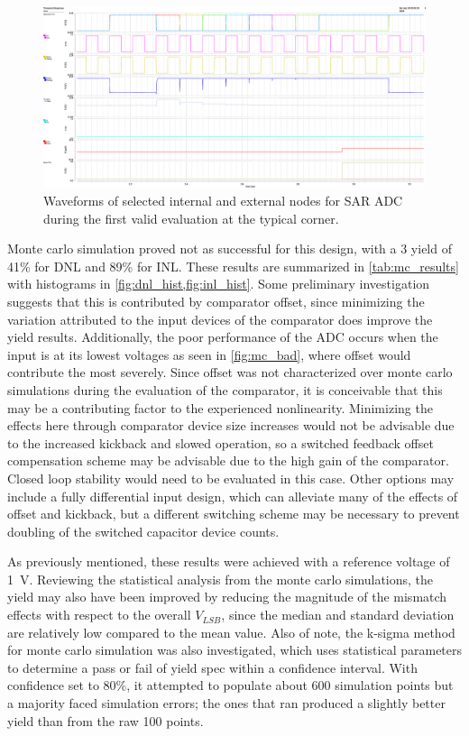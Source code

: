 \documentclass[11pt,letterpaper]{article}
\begin{document}
\begin{figure}[htbp!]
		\centering
	    \includegraphics[width=\textwidth]{images/waveform_typ.eps}
		\caption{Waveforms of selected internal and external nodes for SAR ADC during the first valid evaluation at the typical corner.}\label{fig:typ_wave}
\end{figure}

Monte carlo simulation proved not as successful for this design, with a \qty{3}{\sig} yield of 41\% for DNL and 89\% for INL\@. These results are summarized in \cref{tab:mc_results} with histograms in \cref{fig:dnl_hist,fig:inl_hist}. Some preliminary investigation suggests that this is contributed by comparator offset, since minimizing the variation attributed to the input devices of the comparator does improve the yield results. Additionally, the poor performance of the ADC occurs when the input is at its lowest voltages as seen in \cref{fig:mc_bad}, where offset would contribute the most severely. Since offset was not characterized over monte carlo simulations during the evaluation of the comparator, it is conceivable that this may be a contributing factor to the experienced nonlinearity. Minimizing the effects here through comparator device size increases would not be advisable due to the increased kickback and slowed operation, so a switched feedback offset compensation scheme may be advisable due to the high gain of the comparator. Closed loop stability would need to be evaluated in this case. Other options may include a fully differential input design, which can alleviate many of the effects of offset and kickback, but a different switching scheme may be necessary to prevent doubling of the switched capacitor device counts.

As previously mentioned, these results were achieved with a reference voltage of \qty{1}{\V}. Reviewing the statistical analysis from the monte carlo simulations, the yield may also have been improved by reducing the magnitude of the mismatch effects with respect to the overall \(V_{LSB}\), since the median and standard deviation are relatively low compared to the mean value. Also of note, the k-sigma method for monte carlo simulation was also investigated, which uses statistical parameters to determine a pass or fail of yield spec within a confidence interval. With confidence set to 80\%, it attempted to populate about 600 simulation points but a majority faced simulation errors; the ones that ran produced a slightly better yield than from the raw 100 points.
\end{document}
